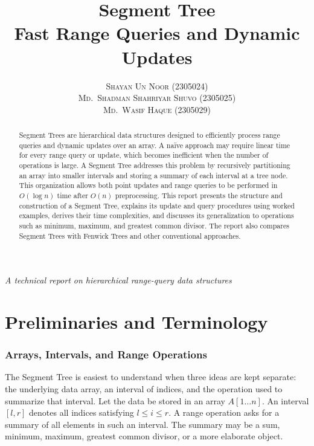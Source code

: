 \documentclass[11pt,open=any,headings=option]{scrreprt}
\title{\textbf{\huge Segment Tree}\\[4pt]\large Fast Range Queries and Dynamic Updates}
\author{\textsc{Shayan Un Noor} (2305024) \\ \textsc{Md.\ Shadman Shahriyar Shuvo} (2305025) \\ \textsc{Md.\ Wasif Haque} (2305029)}
\date{}
\begin{document}
\maketitle
\thispagestyle{empty}
\vfill
\begin{center}
\textit{A technical report on hierarchical range-query data structures}
\end{center}
\clearpage
{}
\tableofcontents
\listoffigures
\listoftables
\clearpage
{}

\begin{abstract}
\noindent Segment Trees are hierarchical data structures designed to efficiently process range queries and dynamic updates over an array. A na\"ive approach may require linear time for every range query or update, which becomes inefficient when the number of operations is large. A Segment Tree addresses this problem by recursively partitioning an array into smaller intervals and storing a summary of each interval at a tree node. This organization allows both point updates and range queries to be performed in $O(\log n)$ time after $O(n)$ preprocessing. This report presents the structure and construction of a Segment Tree, explains its update and query procedures using worked examples, derives their time complexities, and discusses its generalization to operations such as minimum, maximum, and greatest common divisor. The report also compares Segment Trees with Fenwick Trees and other conventional approaches.
\end{abstract}

\chapter{Preliminaries and Terminology}

\subsection{Arrays, Intervals, and Range Operations}
The Segment Tree is easiest to understand when three ideas are kept separate: the underlying data array, an interval of indices, and the operation used to summarize that interval. Let the data be stored in an array $A[1\ldots n]$. An interval $[l,r]$ denotes all indices satisfying $l\leq i\leq r$. A range operation asks for a summary of all elements in such an interval. The summary may be a sum, minimum, maximum, greatest common divisor, or a more elaborate object.
\end{document}
